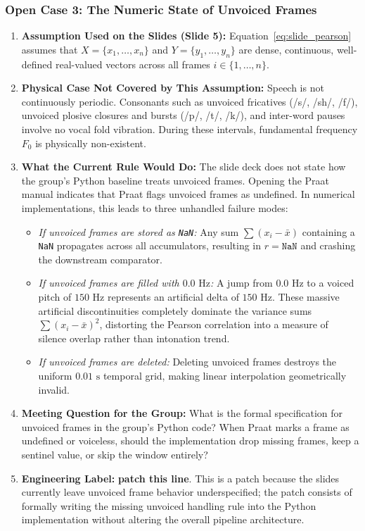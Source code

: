 \documentclass[11pt,a4paper]{article}
\begin{document}
\subsubsection*{Open Case 3: The Numeric State of Unvoiced Frames}

\begin{enumerate}
    \item \textbf{Assumption Used on the Slides (Slide 5):} Equation~\eqref{eq:slide_pearson} assumes that $X = \{x_1, \dots, x_n\}$ and $Y = \{y_1, \dots, y_n\}$ are dense, continuous, well-defined real-valued vectors across all frames $i \in \{1, \dots, n\}$.
    \item \textbf{Physical Case Not Covered by This Assumption:} Speech is not continuously periodic. Consonants such as unvoiced fricatives (/s/, /sh/, /f/), unvoiced plosive closures and bursts (/p/, /t/, /k/), and inter-word pauses involve no vocal fold vibration. During these intervals, fundamental frequency $F_0$ is physically non-existent.
    \item \textbf{What the Current Rule Would Do:} The slide deck does not state how the group's Python baseline treats unvoiced frames. Opening the Praat manual indicates that Praat flags unvoiced frames as undefined. In numerical implementations, this leads to three unhandled failure modes:
    \begin{itemize}
        \item \textit{If unvoiced frames are stored as \texttt{NaN}:} Any sum $\sum (x_i - \bar{x})$ containing a \texttt{NaN} propagates across all accumulators, resulting in $r = \texttt{NaN}$ and crashing the downstream comparator.
        \item \textit{If unvoiced frames are filled with $0.0\text{ Hz}$:} A jump from $0.0\text{ Hz}$ to a voiced pitch of $150\text{ Hz}$ represents an artificial delta of $150\text{ Hz}$. These massive artificial discontinuities completely dominate the variance sums $\sum (x_i - \bar{x})^2$, distorting the Pearson correlation into a measure of silence overlap rather than intonation trend.
        \item \textit{If unvoiced frames are deleted:} Deleting unvoiced frames destroys the uniform $0.01\text{ s}$ temporal grid, making linear interpolation geometrically invalid.
    \end{itemize}
    \item \textbf{Meeting Question for the Group:} What is the formal specification for unvoiced frames in the group's Python code? When Praat marks a frame as undefined or voiceless, should the implementation drop missing frames, keep a sentinel value, or skip the window entirely?
    \item \textbf{Engineering Label:} \textbf{patch this line}. This is a patch because the slides currently leave unvoiced frame behavior underspecified; the patch consists of formally writing the missing unvoiced handling rule into the Python implementation without altering the overall pipeline architecture.
\end{enumerate}
\end{document}
